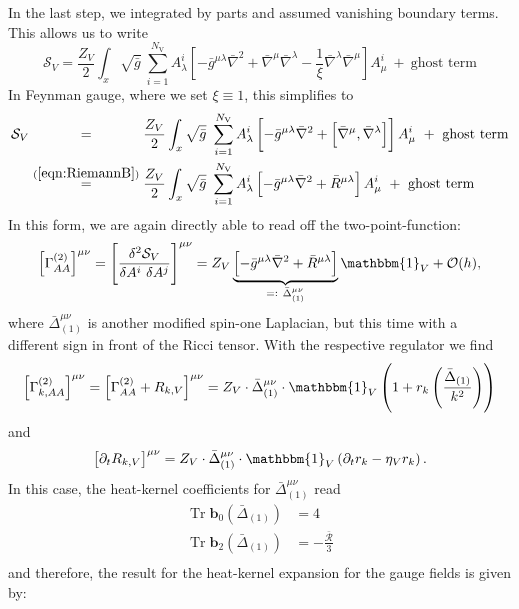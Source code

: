 In the last step, we integrated by parts and assumed vanishing boundary terms.\\
 This allows us to write 
\begin{equation}
\mathcal{S}_V = \frac{Z_{V}}{2} \int_x \sqrt{\bar{g}} \ \sum\limits_{i=1}^{N_{\text{V}}} A_{\lambda}^{i}\left[ - \bar{g}^{\mu\lambda}\bar{\nabla}^2 +  \bar{\nabla}^{\mu}\bar{\nabla}^{\lambda} - \frac{1}{\xi} \bar{\nabla}^{\lambda}\bar{\nabla}^{\mu}\right]A_{\mu}^{i} \ + \ \text{ghost term}
\end{equation}
In Feynman gauge, where we set $\xi \equiv 1$, this simplifies to
\begin{equation}
\begin{aligned}
\mathcal{S}_V &\overset{\phantom{(\mathrm{\ref{eqn:RiemannB}})}}{=} \frac{Z_{V}}{2} \int_x \sqrt{\bar{g}} \ \sum\limits_{i=1}^{N_{\text{V}}} A_{\lambda}^{i}\left[ - \bar{g}^{\mu\lambda}\bar{\nabla}^2 +  \left[\bar{\nabla}^{\mu}, \bar{\nabla}^{\lambda}\right]\right]A_{\mu}^{i} \ + \ \text{ghost term} \\
&\overset{(\mathrm{\ref{eqn:RiemannB}})}{=} \frac{Z_{V}}{2} \int_x \sqrt{\bar{g}} \ \sum\limits_{i=1}^{N_{\text{V}}} A_{\lambda}^{i}\left[ - \bar{g}^{\mu\lambda}\bar{\nabla}^2 +  \bar{R}^{\mu\lambda}\right]A_{\mu}^{i} \ + \ \text{ghost term}
\end{aligned}
\end{equation}
In this form, we are again directly able to read off the two-point-function:
\begin{equation}
	\left[\Gamma^{(2)}_{AA}\right]^{\mu\nu} = \left[\frac{\delta^2 \mathcal{S}_V}{\delta A^{i}\ \delta A^{j}}\right]^{\mu\nu} = Z_V\underbrace{\left[ - \bar{g}^{\mu\lambda}\bar{\nabla}^2 +  \bar{R}^{\mu\lambda}\right]}_{=: \  \bar{\Delta}^{\mu\nu}_{(1)}}\mathbbm{1}_V + \mathcal{O}(h),
\end{equation} 
where $\bar{\Delta}^{\mu\nu}_{(1)}$ is another modified spin-one Laplacian, but this time with a different sign in front of the Ricci tensor.  With the respective regulator we find
\begin{align}
	\left[\Gamma^{(2)}_{k, AA}\right]^{\mu\nu} = \left[\Gamma^{(2)}_{AA}+ R_{k, V}\right]^{\mu\nu}  = Z_V \cdot\bar{\Delta}_{(1)}^{\mu\nu}\cdot\mathbbm{1}_V\left(1 + r_k\left(\frac{\bar{\Delta}_{(1)}}{k^2}\right)\right)
\end{align}
and 
\begin{align}
	\left[\partial_t R_{k, V}\right]^{\mu\nu} = Z_V\cdot\bar{\Delta}_{(1)}^{\mu\nu}\cdot\mathbbm{1}_V\left(\partial_t r_k - \eta_V r_k\right).
\end{align}
In this case, the heat-kernel coefficients for $\bar{\Delta}^{\mu\nu}_{(1)}$ read
\begin{equation}
\begin{aligned}
	\operatorname{Tr}\mathbf{b}_0\left(\bar{\Delta}_{(1)}\right) &= 4 \\
	\operatorname{Tr}\mathbf{b}_2\left(\bar{\Delta}_{(1)}\right) &= -\frac{\bar{\mathcal{R}}}{3} \\
\end{aligned} 
\end{equation}\newpage
and therefore, the result for the heat-kernel expansion for the gauge fields is given by:


